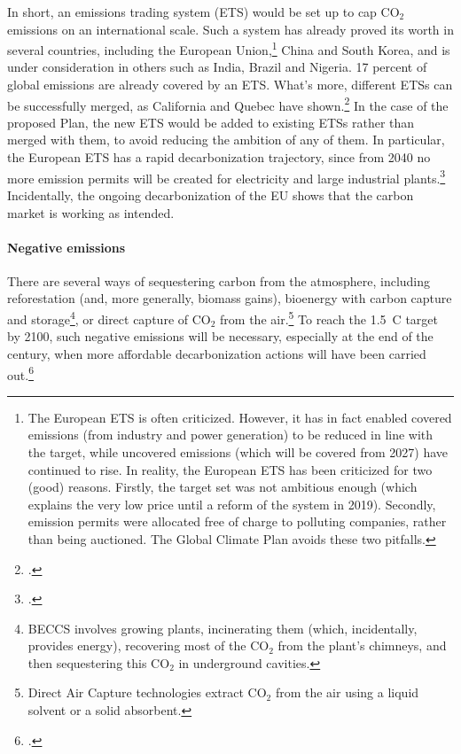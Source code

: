 \documentclass[a5paper,english,openany]{memoir}
\begin{document}
In short, an emissions trading system (ETS) would be set up to cap CO$_\text{2}$ emissions on an international scale. 
Such a system has already proved its worth in several countries, including the European Union,\footnote{The European ETS is often criticized. %
However, it has in fact enabled covered emissions (from industry and power generation) to be reduced in line with the target, while uncovered emissions (which will be covered from 2027) have continued to rise. In reality, the European ETS has been criticized %
for two (good) reasons. Firstly, the target set was not ambitious enough (which explains the very low price until a reform of the system in 2019). Secondly, emission permits were allocated free of charge to polluting companies, rather than being auctioned. The Global Climate Plan avoids these two pitfalls.} 
China and South Korea, and is under consideration in others such as India, Brazil and Nigeria. 17 percent of global emissions are already covered by an ETS. What's more, different ETSs can be successfully merged, as California and Quebec have shown.\footnote{\citet{icap_emissions_2023}.} In the case of the proposed Plan, the new ETS would be added to existing ETSs rather than merged with them, to avoid reducing the ambition of any of them. In particular, the European ETS has a rapid decarbonization trajectory, since from 2040 no more emission permits will be created for electricity and large industrial plants.\footnote{\citet{pahle_emerging_2023}.} Incidentally, the ongoing decarbonization of the EU shows that the carbon market is working as intended.

\paragraph{Negative emissions}
There are several ways of sequestering carbon from the atmosphere, including reforestation (and, more generally, biomass gains), bioenergy with carbon capture and storage\footnote{BECCS involves growing plants, incinerating them (which, incidentally, provides energy), recovering most of the CO$_\text{2}$ from the plant's chimneys, and then sequestering this CO$_\text{2}$ in underground cavities.}, or direct capture of CO$_\text{2}$ from the air.\footnote{Direct Air Capture technologies extract CO$_\text{2}$ from the air using a liquid solvent or a solid absorbent.} 
To reach the 1.5~\textdegree{}C target by 2100, such negative emissions will be necessary, especially at the end of the century, when more affordable decarbonization actions will have been carried out.\footnote{\citet{minx_negative_2018}.} 
\end{document}
